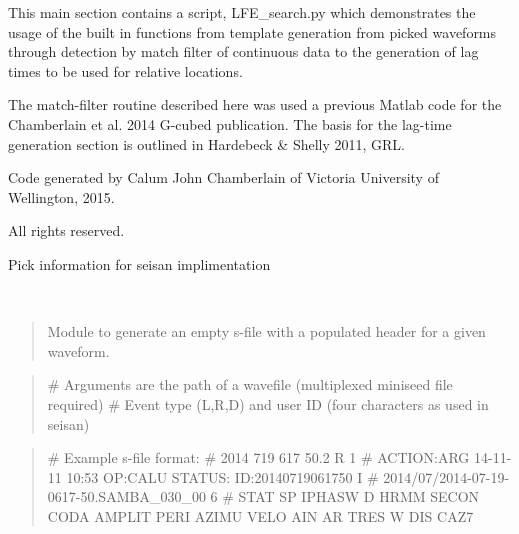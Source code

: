 \documentclass[a4paper,10pt,english]{sphinxmanual}
\begin{document}
This main section contains a script, LFE\_search.py which demonstrates the usage
of the built in functions from template generation from picked waveforms
through detection by match filter of continuous data to the generation of lag
times to be used for relative locations.

The match-filter routine described here was used a previous Matlab code for the
Chamberlain et al. 2014 G-cubed publication.  The basis for the lag-time
generation section is outlined in Hardebeck \& Shelly 2011, GRL.

Code generated by Calum John Chamberlain of Victoria University of Wellington,
2015.

All rights reserved.

\begin{fulllineitems}
\label{modules:Sfile_util.PICK}
Pick information for seisan implimentation

\end{fulllineitems}


\begin{fulllineitems}
\label{modules:Sfile_util.blanksfile}~\begin{quote}

Module to generate an empty s-file with a populated header for a given
waveform.
\end{quote}
\begin{quote}

\# Arguments are the path of a wavefile (multiplexed miniseed file required)
\# Event type (L,R,D) and user ID (four characters as used in seisan)
\end{quote}
\begin{quote}

\# Example s-file format:
\# 2014  719  617 50.2 R                                                         1
\# ACTION:ARG 14-11-11 10:53 OP:CALU STATUS:               ID:20140719061750     I
\# 2014/07/2014-07-19-0617-50.SAMBA\_030\_00                                       6
\# STAT SP IPHASW D HRMM SECON CODA AMPLIT PERI AZIMU VELO AIN AR TRES W  DIS CAZ7
\end{quote}

\end{fulllineitems}
\end{document}
